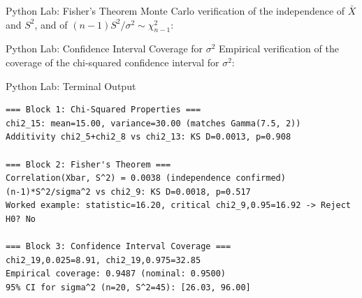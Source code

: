 \documentclass[aspectratio=169,xcolor={dvipsnames,table}]{beamer}
\begin{document}
\begin{frame}[fragile]{Python Lab: Fisher's Theorem}
	\vspace{-0.05cm}
	\scriptsize
	Monte Carlo verification of the independence of $\bar X$ and $S^2$, and of $(n-1)S^2/\sigma^2\sim\chi^2_{n-1}$:
	{
	}
\end{frame}

\begin{frame}[fragile]{Python Lab: Confidence Interval Coverage for $\sigma^2$}
	\vspace{-0.05cm}
	\scriptsize
	Empirical verification of the coverage of the chi-squared confidence interval for $\sigma^2$:
	{
	}
\end{frame}

\begin{frame}[fragile]{Python Lab: Terminal Output}
	\vspace{-0.1cm}
	\begin{block}{}
		\fontsize{4pt}{5pt}\selectfont
		\begin{verbatim}
=== Block 1: Chi-Squared Properties ===
chi2_15: mean=15.00, variance=30.00 (matches Gamma(7.5, 2))
Additivity chi2_5+chi2_8 vs chi2_13: KS D=0.0013, p=0.908

=== Block 2: Fisher's Theorem ===
Correlation(Xbar, S^2) = 0.0038 (independence confirmed)
(n-1)*S^2/sigma^2 vs chi2_9: KS D=0.0018, p=0.517
Worked example: statistic=16.20, critical chi2_9,0.95=16.92 -> Reject H0? No

=== Block 3: Confidence Interval Coverage ===
chi2_19,0.025=8.91, chi2_19,0.975=32.85
Empirical coverage: 0.9487 (nominal: 0.9500)
95% CI for sigma^2 (n=20, S^2=45): [26.03, 96.00]
		\end{verbatim}
	\end{block}
\end{frame}
\end{document}
